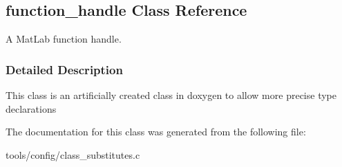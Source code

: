 \hypertarget{classfunction__handle}{}\subsection{function\+\_\+handle Class Reference}
\label{classfunction__handle}


A Mat\+Lab function handle.  




\subsubsection{Detailed Description}
This class is an artificially created class in doxygen to allow more precise type declarations 

The documentation for this class was generated from the following file\+:\begin{DoxyCompactItemize}
\item 
tools/config/class\+\_\+substitutes.\+c\end{DoxyCompactItemize}

